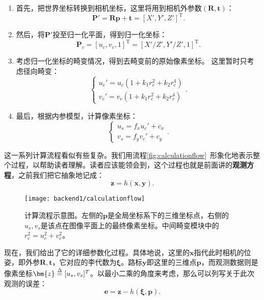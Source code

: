 \begin{enumerate}
	\item 首先，把世界坐标转换到相机坐标，这里将用到相机外参数$(\bm{R}, \bm{t})$：
	\begin{equation}
	\bm{P}' = \bm{R} \bm{p} + \bm{t} = [X', Y', Z']^\mathrm{T}.
	\end{equation}
	\item 然后，将$\bm{P}'$投至归一化平面，得到归一化坐标：
	\begin{equation}
	\bm{P}_c = [u_c, v_c, 1]^\mathrm{T} = [X'/Z', Y'/Z', 1]^\mathrm{T}.
	\end{equation}
	\item 考虑归一化坐标的畸变情况，得到去畸变前的原始像素坐标。
这里暂时只考虑径向畸变：
\clearpage
	\begin{equation}
	\left\{
	\begin{array}{l}
	u_c' = {u_c}\left( {1 + {k_1}r_c^2 + {k_2}r_c^4} \right)\\
	v_c' = {v_c}\left( {1 + {k_1}r_c^2 + {k_2}r_c^4} \right)
	\end{array}
	\right. .
	\end{equation}
	\item 最后，根据内参模型，计算像素坐标：
	\begin{equation}
	\left\{ \begin{array}{l}
	{u_s} = {f_x}u_c' + {c_x}\\
	{v_s} = {f_y}v_c' + {c_y} 
	\end{array} \right. .
	\end{equation}
\end{enumerate}

这一系列计算流程看似有些复杂。我们用流程\autoref{fig:calculationflow}~形象化地表示整个过程，以帮助读者理解。读者应该能领会到，这个过程也就是前面讲的\textbf{观测方程}，之前我们把它抽象地记成：
\begin{equation}
\bm{z} = h(\bm{x}, \bm{y}).
\end{equation}

\begin{figure}[!htp]
	\centering
	\texttt{[image: backend1/calculationflow]}
	\caption{计算流程示意图。左侧的$\bm{p}$是全局坐标系下的三维坐标点，右侧的$u_s,v_s$是该点在图像平面上的最终像素坐标。中间畸变模块中的$r_c^2=u_c^2 + v_c^2$。}
	\label{fig:calculationflow}
\end{figure}

现在，我们给出了它的详细参数化过程。具体地说，这里的$\bm{x}$指代此时相机的位姿，即外参$\bm{R}, \bm{t}$，它对应的李代数为$\bm{\xi}$。路标$\bm{y}$即这里的三维点$\bm{p}$，而观测数据则是像素坐标$\bm{z} \buildrel \Delta \over = [u_s, v_s]^T $。以最小二乘的角度来考虑，那么可以列写关于此次观测的误差：
\begin{equation}
\bm{e} = \bm{z} - h(\bm{\xi}, \bm{p}).
\end{equation}

